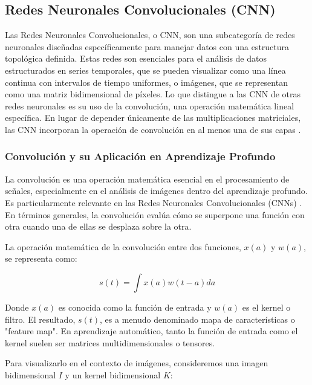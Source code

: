         \subsection{Redes Neuronales Convolucionales (CNN)}
            Las Redes Neuronales Convolucionales, o CNN, son una subcategoría de redes neuronales diseñadas específicamente para manejar datos con una estructura topológica definida. Estas redes son esenciales para el análisis de datos estructurados en series temporales, que se pueden visualizar como una línea continua con intervalos de tiempo uniformes, o imágenes, que se representan como una matriz bidimensional de píxeles. Lo que distingue a las CNN de otras redes neuronales es su uso de la convolución, una operación matemática lineal específica. En lugar de depender únicamente de las multiplicaciones matriciales, las CNN incorporan la operación de convolución en al menos una de sus capas 
            \autocite{Goodfellow2016}.

            \subsubsection{Convolución y su Aplicación en Aprendizaje Profundo}
                La convolución es una operación matemática esencial en el procesamiento de señales, especialmente en el análisis de imágenes dentro del aprendizaje profundo. Es particularmente relevante en las Redes Neuronales Convolucionales (CNNs) \autocite{Goodfellow2016}. En términos generales, la convolución evalúa cómo se superpone una función con otra cuando una de ellas se desplaza sobre la otra.
                
                La operación matemática de la convolución entre dos funciones, $x(a)$ y $w(a)$, se representa como:
                
                \begin{equation}
                s(t) = \int x(a)w(t-a)da
                \end{equation}
                
                Donde $x(a)$ es conocida como la función de entrada y $w(a)$ es el kernel o filtro. El resultado, $s(t)$, es a menudo denominado mapa de características o "feature map". En aprendizaje automático, tanto la función de entrada como el kernel suelen ser matrices multidimensionales o tensores.
                
                Para visualizarlo en el contexto de imágenes, consideremos una imagen bidimensional $I$ y un kernel bidimensional $K$:
                
